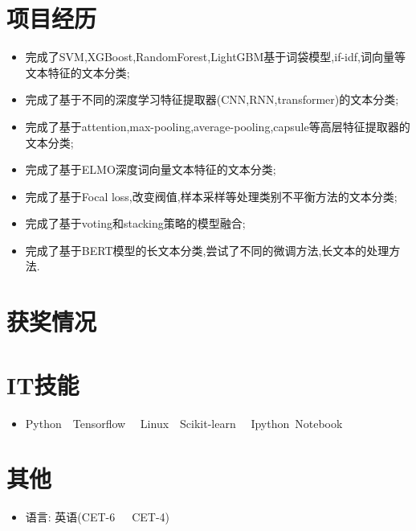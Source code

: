 \documentclass{resume}
\begin{document}
\section{项目经历}
\begin{itemize}
  \item 完成了SVM,XGBoost,RandomForest,LightGBM基于词袋模型,if-idf,词向量等文本特征的文本分类;
  \item 完成了基于不同的深度学习特征提取器(CNN,RNN,transformer)的文本分类;
  \item 完成了基于attention,max-pooling,average-pooling,capsule等高层特征提取器的文本分类;
  \item 完成了基于ELMO深度词向量文本特征的文本分类;
  \item 完成了基于Focal loss,改变阀值,样本采样等处理类别不平衡方法的文本分类;
  \item 完成了基于voting和stacking策略的模型融合;
  \item 完成了基于BERT模型的长文本分类,尝试了不同的微调方法,长文本的处理方法.
\end{itemize}


\section{获奖情况}

\section{IT技能}
\begin{itemize}[parsep=0.5ex]
  \item Python\ \ Tensorflow \ \ Linux\ \ Scikit-learn \ \ Ipython\ Notebook 
\end{itemize}


\section{其他}
\begin{itemize}[parsep=0.5ex]
  \item 语言: 英语(CET-6\ \ \ CET-4)
\end{itemize}
\end{document}
